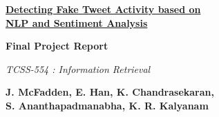 \documentclass{article}[12pt]
\numberwithin{equation}{subsection}
\begin{document}
\begin{center}
\begin{Huge}
\textbf{\underline{Detecting Fake Tweet Activity based on}} \\
\textbf{\underline{NLP and Sentiment Analysis}} \\
\end{Huge}
\end{center}

\begin{center}
\begin{huge}
\textbf{Final Project Report} \\
\end{huge}
\end{center}

\begin{center}
\begin{large}
\emph{TCSS-554 : Information Retrieval}
\end{large}
\end{center}

\begin{center}
\begin{Large}
\textbf{J. McFadden, E. Han, K. Chandrasekaran,} \\
\textbf{S. Ananthapadmanabha, K. R. Kalyanam}
\end{Large}
\end{center}


\vspace{0.75in}
\end{document}
